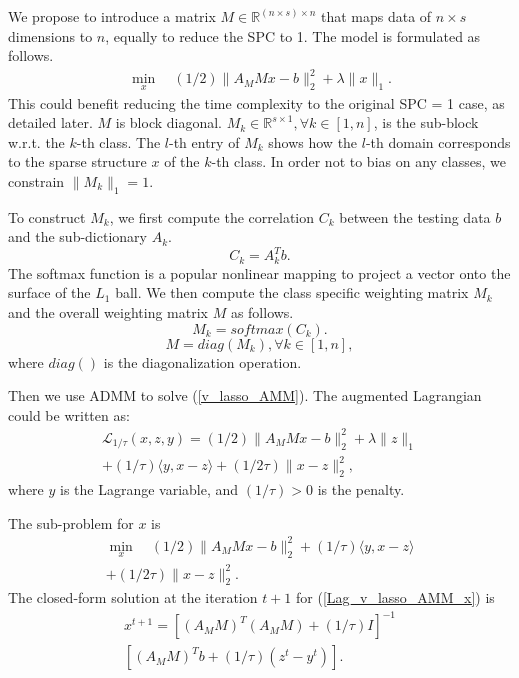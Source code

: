 \documentclass{article}
\begin{document}
We propose to introduce a matrix $M \in \mathbb{R}^{(n \times s) \times n}$ that maps data of $n \times s$ dimensions to $n$, equally to reduce the SPC to 1. The model is formulated as follows.
\begin{equation}
\label{v_lasso_AMM}
\begin{split}
\min_x \quad(1/2)\|A_MMx-b\|^2_2+\lambda\|x\|_1.
\end{split}
\end{equation}
This could benefit reducing the time complexity to the original SPC = 1 case, as detailed later. $M$ is block diagonal. $M_k \in \mathbb{R}^{s \times 1}, \forall k \in [1,n]$, is the sub-block w.r.t. the $k$-th class. The $l$-th entry of $M_k$ shows how the $l$-th domain corresponds to the sparse structure $x$ of the $k$-th class. In order not to bias on any classes, we constrain $\|M_k\|_1=1$. 

To construct $M_k$, we first compute the correlation $C_k$ between the testing data $b$ and the sub-dictionary $A_k$.
\begin{equation}
\label{C_k}C_k = A_k^Tb.%
\end{equation}
The softmax function is a popular nonlinear mapping to project a vector onto the surface of the $L_1$ ball. We then compute the class specific weighting matrix $M_k$ and the overall weighting matrix $M$ as follows.
\begin{equation}
\label{M_k}M_k = softmax(C_k).
\end{equation}
\begin{equation}
\label{M}M=diag(M_k), \forall k \in [1,n],
\end{equation}
where $diag()$ is the diagonalization operation.

Then we use ADMM to solve (\ref{v_lasso_AMM}). The augmented Lagrangian could be written as:
\begin{equation}
\label{Lag_v_lasso_AMM}
\begin{split}
\mathcal{L}_{1/ \tau}(x,z,y)=(1/2)\|A_MMx-b\|^2_2+\lambda\|z\|_1 \\ +(1/\tau)\langle y,x-z \rangle+(1/2 \tau) \|x-z\|^2_2,
\end{split}
\end{equation}
where $y$ is the Lagrange variable, and $(1/\tau)>0$ is the penalty. 

The sub-problem for $x$ is
\begin{equation}
\label{Lag_v_lasso_AMM_x}
\begin{split}
\min_x \quad(1/2)\|A_MMx-b\|^2_2+(1/\tau)\langle y,x-z \rangle \\ +(1/2 \tau) \|x-z\|^2_2.
\end{split}
\end{equation}
The closed-form solution at the iteration $t+1$ for (\ref{Lag_v_lasso_AMM_x}) is
\begin{equation}
\label{Lag_v_lasso_AMM_x_ans}
\begin{split}
x^{t+1}=[(A_MM)^T(A_MM)+(1/\tau)I]^{-1} \\ [(A_MM)^Tb+(1/\tau)(z^{t}-y^{t})].
\end{split}
\end{equation}
\end{document}
